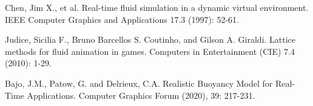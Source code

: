 \begin{thebibliography}{99}
	Chen, Jim X., et al.
	Real-time fluid simulation in a dynamic virtual environment.
	IEEE Computer Graphics and Applications 17.3 (1997): 52-61.

	Judice, Sicilia F., Bruno Barcellos S. Coutinho, and Gilson A. Giraldi.
	Lattice methods for fluid animation in games.
	Computers in Entertainment (CIE) 7.4 (2010): 1-29.

	 Bajo, J.M., Patow, G. and Delrieux, C.A.
	Realistic Buoyancy Model for Real-Time Applications.
	Computer Graphics Forum (2020), 39: 217-231.
\end{thebibliography}